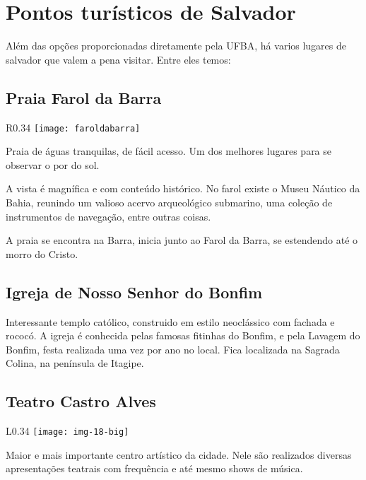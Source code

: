 	            \section{Pontos turísticos de Salvador}
	                
	                 Além das opções proporcionadas diretamente pela UFBA, há varios lugares de salvador que valem a pena visitar. Entre eles temos:
	                 
\subsection {Praia Farol da Barra} 
\begin{wrapfigure}{R}{0.34\textwidth}
\centering                        \texttt{[image: faroldabarra]}                        \end{wrapfigure}

Praia de águas tranquilas, de fácil acesso. Um dos melhores lugares para se observar o por do sol. 

A vista é magnífica e com conteúdo histórico. No farol existe o Museu Náutico da Bahia, reunindo um valioso acervo arqueológico submarino, uma coleção de instrumentos de navegação, entre outras coisas. 

A praia se encontra na Barra, inicia junto ao Farol da Barra, se estendendo até o morro do Cristo.
                          
\subsection {Igreja de Nosso Senhor do Bonfim}

Interessante templo católico, construido em estilo neoclássico com fachada e rococó. A igreja é conhecida pelas famosas fitinhas do Bonfim, e pela Lavagem do Bonfim, festa realizada uma vez por ano no local. Fica localizada na Sagrada Colina, na península de Itagipe.

\subsection {Teatro Castro Alves}       \begin{wrapfigure}{L}{0.34\textwidth}
\centering     \texttt{[image: img-18-big]}
\end{wrapfigure}   
                     Maior e mais importante centro artístico da cidade. Nele são realizados diversas apresentações teatrais com frequência e até mesmo shows de música. 
                     
